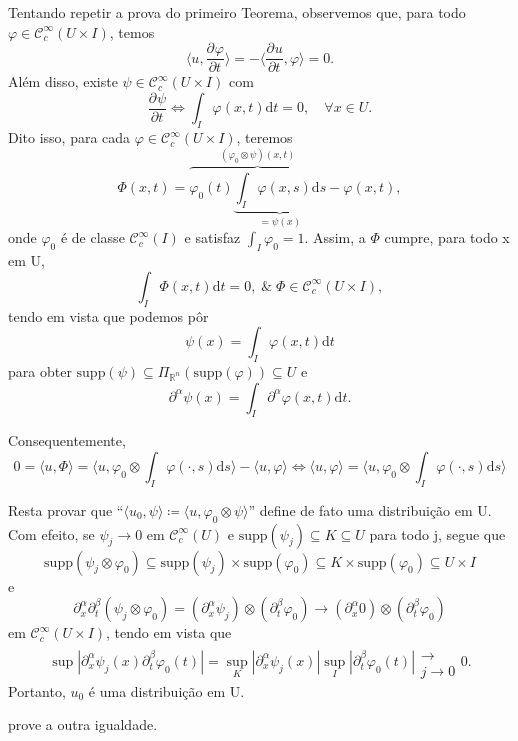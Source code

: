 \documentclass[../distribution_theory_notes.tex]{subfiles}
\begin{document}
\begin{proof*}
	Tentando repetir a prova do primeiro Teorema, observemos que, para todo \(\varphi \in \mathcal{C}_{c}^{\infty}(U\times I)\), temos
	\[
		\biggl\langle u, \frac{\partial^{}\varphi }{\partial t^{}} \biggr\rangle = - \biggl\langle \frac{\partial^{}u}{\partial t^{}}, \varphi \biggr\rangle = 0.
	\]
	Além disso, existe \(\psi \in \mathcal{C}_{c}^{\infty}(U\times I)\) com
	\[
		\frac{\partial^{}\psi }{\partial t^{}} \Longleftrightarrow \int_{I}^{}\varphi (x, t) \mathrm{d}t =0, \quad \forall x\in U.
	\]
	Dito isso, para cada \(\varphi \in \mathcal{C}_{c}^{\infty}(U\times I)\), teremos
	\[
		\Phi (x, t)= \overbrace{\varphi_{0}(t) \underbrace{\int_{I}^{}\varphi (x, s) \mathrm{d}s}_{=\psi (x)}}^{(\varphi_{0}\otimes \psi )(x, t)} - \varphi (x, t),
	\]
	onde \(\varphi_{0}\) é de classe \(\mathcal{C}_{c}^{\infty}(I)\) e satisfaz \(\int_{I}^{}\varphi_{0} =1\). Assim, a \(\Phi \) cumpre, para todo x em U,
	\[
		\int_{I}^{}\Phi (x, t) \mathrm{d}t = 0, \;\&\; \Phi \in \mathcal{C}_{c}^{\infty}(U\times I),
	\]
	tendo em vista que podemos pôr
	\[
		\psi (x)=\int_{I}^{}\varphi (x, t) \mathrm{d}t
	\]
	para obter \(\mathrm{supp}(\psi )\subseteq \Pi_{\mathbb{R}^{n}}(\mathrm{supp}(\varphi ))\subseteq U\) e
	\[
		\partial^{\alpha }\psi (x) = \int_{I}^{}\partial^{\alpha }\varphi (x, t) \mathrm{d}t.
	\]

	Consequentemente,
	\[
		0=\langle u, \Phi  \rangle = \biggl\langle u, \varphi_{0}\otimes \int_{I}^{}\varphi (\cdot , s) \mathrm{d}s \biggr\rangle - \langle u, \varphi  \rangle \Longleftrightarrow \langle u, \varphi  \rangle = \biggl\langle u, \varphi_{0} \otimes \int_{I}^{}\varphi (\cdot , s) \mathrm{d}s \biggr\rangle
	\]

	Resta provar que ``\(\langle u_{0}, \psi  \rangle\coloneqq \langle u, \varphi_{0}\otimes \psi  \rangle\)'' define de fato uma distribuição em U. Com efeito, se \(\psi_{j}\to 0\) em \(\mathcal{C}_{c}^{\infty}(U)\) e \(\mathrm{supp}(\psi_{j})\subseteq K\subseteq U\) para todo j, segue que
	\[
		\mathrm{supp}(\psi_{j}\otimes \varphi_{0})\subseteq \mathrm{supp}(\psi_{j}) \times \mathrm{supp}(\varphi_{0})\subseteq K\times \mathrm{supp}(\varphi_{0}) \subseteq U\times I
	\]
	e
	\[
		\partial_{x}^{\alpha }\partial_{t}^{\beta }(\psi_{j}\otimes \varphi_{0})=(\partial_{x}^{\alpha }\psi_{j})\otimes (\partial_{t}^{\beta }\varphi_{0})\to (\partial_{x}^{\alpha }0) \otimes (\partial_{t}^{\beta }\varphi_{0})
	\]
	em  \(\mathcal{C}_{c}^{\infty}(U\times I)\), tendo em vista que
	\[
		\sup_{}| \partial_{x}^{\alpha }\psi_{j}(x)\partial_{t}^{\beta }\varphi_{0}(t) | = \sup_{K}| \partial_x^{\alpha } \psi_j(x)| \sup_{I}| \partial_{t}^{\beta }\varphi_{0}(t) |\substack{ \\ \longrightarrow \\ j\to0}0.
	\]
	Portanto, \(u_{0}\) é uma distribuição em U. \qedsymbol
\end{proof*}
\begin{exr}
	prove a outra igualdade.
\end{exr}
\end{document}
